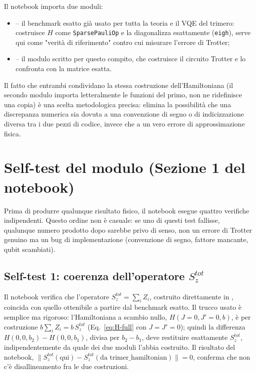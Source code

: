 \documentclass[11pt,a4paper]{article}
\begin{document}
Il notebook importa due moduli:
\begin{itemize}
\item \texttt{} -- il benchmark esatto già
usato per tutta la teoria e il VQE del trimero: costruisce $H$ come
\texttt{SparsePauliOp} e la diagonalizza esattamente (\texttt{eigh}),
serve qui come "verità di riferimento" contro cui misurare l'errore di
Trotter;
\item \texttt{} -- il modulo scritto per
questo compito, che costruisce il circuito Trotter e lo confronta con la
matrice esatta.
\end{itemize}
Il fatto che entrambi condividano la stessa costruzione
dell'Hamiltoniana (il secondo modulo importa letteralmente le funzioni
del primo, non ne ridefinisce una copia) è una scelta metodologica
precisa: elimina la possibilità che una discrepanza numerica sia dovuta a
una convenzione di segno o di indicizzazione diversa tra i due pezzi di
codice, invece che a un vero errore di approssimazione fisica.

\section{Self-test del modulo (Sezione 1 del notebook)}
\label{sec:self-test}

Prima di produrre qualunque risultato fisico, il notebook esegue quattro
verifiche indipendenti. Questo ordine non è casuale: se uno di questi
test fallisse, qualunque numero prodotto dopo sarebbe privo di senso, non
un errore di Trotter genuino ma un bug di implementazione (convenzione di
segno, fattore mancante, qubit scambiati).

\subsection{Self-test 1: coerenza dell'operatore $S_z^{tot}$}

Il notebook verifica che l'operatore $S_z^{tot}=\sum_i Z_i$, costruito
direttamente in \texttt{}, coincida con
quello ottenibile a partire dal benchmark esatto. Il trucco usato è
semplice ma rigoroso: l'Hamiltoniana a scambio nullo, $H(J{=}0,J'{=}0,b)$,
è per costruzione $b\sum_iZ_i=b\,S_z^{tot}$ (Eq.~\eqref{eq:H-full} con
$J=J'=0$); quindi la differenza $H(0,0,b_2)-H(0,0,b_1)$, divisa per
$b_2-b_1$, deve restituire esattamente $S_z^{tot}$, indipendentemente da
quale dei due moduli l'abbia costruito. Il risultato del notebook,
$\|S_z^{tot}(\text{qui})-S_z^{tot}(\text{da trimer\_hamiltonian})\|=0$,
conferma che non c'è disallineamento fra le due costruzioni.
\end{document}
